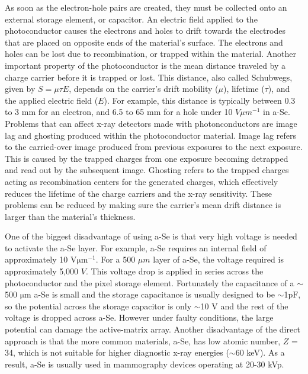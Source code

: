 As soon as the electron-hole pairs are created, they must be collected onto an external storage element, or capacitor.  An electric field applied to the photoconductor causes the electrons and holes to drift towards the electrodes that are placed on opposite ends of the material's surface.  The electrons and holes can be lost due to recombination, or trapped within the material.  Another important property of the photoconductor is the mean distance traveled by a charge carrier before it is trapped or lost.  This distance, also called Schubwegs, given by $S = \mu \tau E$, depends on the carrier's drift mobility ($\mu$), lifetime ($\tau$), and the applied electric field ($E$).  For example, this distance is typically between 0.3 to 3 $\mathrm{mm}$ for an electron, and 6.5 to 65 $\mathrm{mm}$ for a hole under 10 $V \mu m^{-1}$ in a-Se.  Problems that can affect x-ray detectors made with photonconductors are image lag and ghosting produced within the photoconductor material.  Image lag refers to the carried-over image produced from previous exposures to the next exposure.  This is caused by the trapped charges from one exposure becoming detrapped and read out by the subsequent image.  Ghosting refers to the trapped charges acting as recombination centers for the generated charges, which effectively reduces the lifetime of the charge carriers and the x-ray sensitivity.  These problems can be reduced by making sure the carrier's mean drift distance is larger than the material's thickness.

One of the biggest disadvantage of using a-Se is that very high voltage is needed to activate the a-Se layer.  For example, a-Se requires an internal field of approximately 10 $\mathrm{V \mu m^{-1}}$.  For a 500 $\mu m$ layer of a-Se, the voltage required is approximately 5,000 $V$.  This voltage drop is applied in series across the photoconductor and the pixel storage element.  Fortunately the capacitance of a $\sim$500 $\mathrm{\mu m}$ a-Se is small and the storage capacitance is usually designed to be $\sim$1$\mathrm{pF}$, so the potential across the storage capacitor is only $\sim$10 V and the rest of the voltage is dropped across a-Se.  However under faulty conditions, the large potential can damage the active-matrix array.  Another disadvantage of the direct approach is that the more common materials, a-Se, has low atomic number, $Z$ = 34, which is not suitable for higher diagnostic x-ray energies ($\sim$60 keV).  As a result, a-Se is usually used in mammography devices operating at 20-30 kVp.

